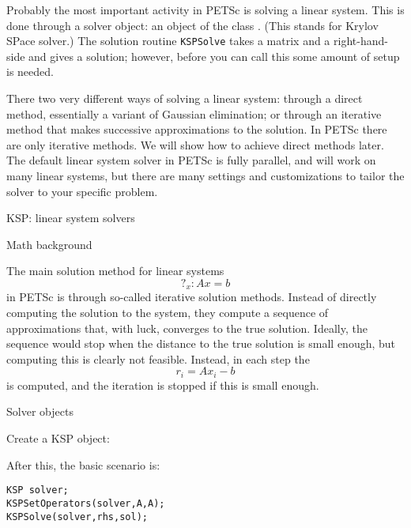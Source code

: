 
Probably the most important activity in PETSc is solving a linear
system. This is done through a solver object: an object of the class
. (This stands for Krylov SPace solver.) The solution routine
\lstinline{KSPSolve} takes a matrix and a right-hand-side and gives a
solution; however, before you can call this some amount of setup is needed.

There two very different ways of solving a
linear system: through a direct method, essentially a variant of
Gaussian elimination; or through an iterative method that makes
successive approximations to the solution. In PETSc there are only
iterative methods. We will show how to achieve direct methods later.
The default linear system solver in PETSc is fully parallel, and will
work on many linear systems, but there are many settings and
customizations to tailor the solver to your specific problem.

 {KSP: linear system solvers}
\label{sec:petsc-ksp}

 {Math background}

The main solution method for linear systems
\[ ?_x\colon Ax=b \]
in PETSc is through
so-called iterative solution methods. Instead of directly computing
the solution to the system, they compute a sequence of approximations
that, with luck, converges to the true solution. Ideally, the sequence
would stop when the distance to the true solution is small enough, but
computing this is clearly not feasible. Instead, in each step the
\[ r_i=Ax_i-b \]
is computed, and the iteration is stopped if this is small enough.

 {Solver objects}

Create a KSP object:
%

After this, the basic scenario is:
\begin{lstlisting}
KSP solver;
KSPSetOperators(solver,A,A);
KSPSolve(solver,rhs,sol);
\end{lstlisting}


